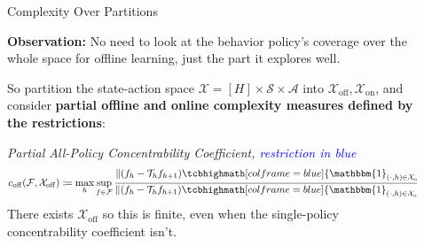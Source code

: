 \documentclass[final]{beamer}
\newcommand{\off}{\operatorname{off}}
\newcommand{\on}{\operatorname{on}}
\newcommand{\gX}{\mathcal{X}}
\newcommand{\gA}{\mathcal{A}}
\newcommand{\gS}{\mathcal{S}}
\newcommand{\gF}{\mathcal{F}}
\newcommand{\gT}{\mathcal{T}}
\newlength{\sepwidth}
\newlength{\colwidth}
\newcommand{\separatorcolumn}{\begin{column}{\sepwidth}\end{column}}
\begin{document}
\begin{frame}[t]
\begin{columns}[t]
\begin{column}{\colwidth}


\end{column}


\separatorcolumn

\begin{column}{\colwidth}

  \begin{block}{Complexity Over Partitions}

  \textbf{Observation:} No need to look at the behavior policy's coverage over the whole space for offline learning, just the part it explores well. 
  
  So partition the state-action space $\gX = [H] \times \gS \times \gA$ into $\gX_{\off}, \gX_{\on}$, and consider \textbf{partial offline and online complexity measures defined by the restrictions}:
  
    \textit{Partial All-Policy Concentrability Coefficient, \textcolor{blue}{restriction in blue}}
        $$c_{\off}(\gF, \gX_{\off}) 
    \coloneqq \max_h \sup_{f \in \gF} \frac{\|(f_h - \gT_h f_{h+1}) \tcbhighmath[colframe=blue]{\mathbbm{1}_{(\cdot, h) \in \gX_{\off}}}\|_{2, d_h^\pi}^2}{\|(f_h - \gT_h f_{h+1})\tcbhighmath[colframe=blue]{\mathbbm{1}_{(\cdot, h) \in \gX_{\off}}}\|_{2, \mu_{h}}^2}.$$
    {\small There exists $\gX_{\off}$ so this is finite, even when the single-policy concentrability coefficient isn't.}


\end{block}
\end{column}
\end{columns}
\end{frame}
\end{document}
